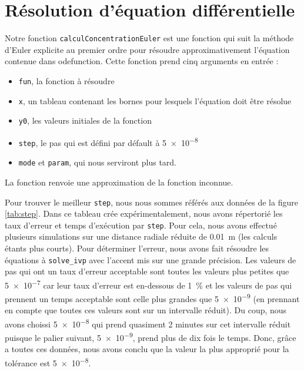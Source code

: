 \documentclass[11pt]{report}
\begin{document}
        \section{Résolution d'équation différentielle}
            Notre fonction \verb|calculConcentrationEuler| est une fonction qui suit la méthode d'Euler explicite au premier ordre
            pour résoudre approximativement l'équation contenue dans odefunction.
            Cette fonction prend cinq arguments en entrée :
            \begin{itemize}
                \item \verb|fun|, la fonction à résoudre
                \item \verb|x|, un tableau contenant les bornes pour lesquels l'équation doit être résolue
                \item \verb|y0|, les valeurs initiales de la fonction
                \item \verb|step|, le pas qui est défini par défault à \num{5e-8}
                \item \verb|mode| et \verb|param|, qui nous serviront plus tard.
            \end{itemize}
            La fonction renvoie une approximation de la fonction inconnue.
            \par
            Pour trouver le meilleur \verb|step|, nous nous sommes référés aux données de la figure \ref{tab:step}.
            Dans ce tableau crée expérimentalement, nous avons répertorié les taux d'erreur et temps d'exécution par \verb|step|.
            Pour cela, nous avons effectué plusieurs simulations sur une distance radiale réduite de \SI{0.01}{\meter} (les calculs étants plus courts).
            Pour déterminer l'erreur, nous avons fait résoudre les équations à \verb|solve_ivp| avec l'accent mis sur une grande précision. Les
            valeurs de pas qui ont un taux d'erreur acceptable sont toutes les valeurs plus petites que \num{5e-7}
            car leur taux d'erreur est en-dessous de \SI{1}{\percent} et les valeurs de pas qui prennent
            un temps acceptable sont celle plus grandes que \num{5e-9} (en prennant en compte
            que toutes ces valeurs sont sur un intervalle réduit). Du coup, nous avons choissi \num{5e-8} qui prend quasiment 2 minutes
            sur cet intervalle réduit puisque le palier suivant, \num{5e-9}, prend plus de dix fois le temps.
            Donc, grâce a toutes ces données, nous avons conclu que la valeur la plus approprié pour la
            tolérance est \num{5e-8}.
            \par
\end{document}
